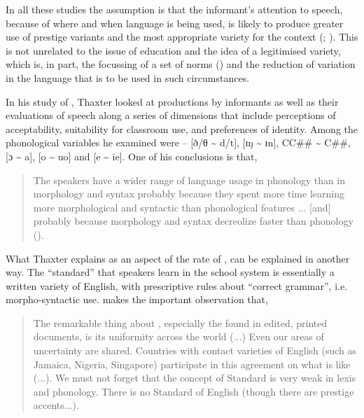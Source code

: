 In all these studies the assumption is that the informant’s attention to speech, because of where and when language is being used, is likely to produce greater use of prestige variants and the most appropriate variety for the context (\citealt{Labov1966,Labov1972}; \citealt{Wolfson1976}).  This is not unrelated to the issue of education and the idea of a legitimised variety, which is, in part, the focussing of a set of norms (\citealt{LePage1975}) and the reduction of variation in the language that is to be used in such circumstances.   

In his study of , Thaxter looked at productions by informants as well as their evaluations of speech along a series of dimensions that include perceptions of acceptability, suitability for classroom use, and preferences of identity.  Among the phonological variables he examined were –  [ð/θ {\textasciitilde} d/t], [ɪŋ {\textasciitilde} ɪn], CC\#\# {\textasciitilde} C\#\#, [ɔ {\textasciitilde} a], [o {\textasciitilde} uo] and [e {\textasciitilde} ie].  One of his conclusions is that,

\begin{quote}The speakers have a wider range of language usage in phonology than in morphology and syntax probably because they spent more time learning more morphological and syntactic than phonological features ... [and] probably because morphology and syntax decreolize faster than phonology (\citeyear[215]{Thaxter1977}).\end{quote}

What Thaxter explains as an aspect of the rate of , can be explained in another way.  The “standard” that speakers learn in the school system is essentially a written variety of English, with prescriptive rules about “correct grammar”, i.e. morpho-syntactic use.  \citet[370]{Gupta2001} makes the important observation that, 

\begin{quote}The remarkable thing about , especially the  found in edited, printed documents, is its uniformity across the world (...) Even our areas of uncertainty are shared.  Countries with contact varieties of English (such as Jamaica, Nigeria, Singapore) participate in this agreement on what  is like (...). We must not forget that the concept of Standard is very weak in lexis and phonology.  There is no Standard  of English (though there are prestige accents...).\end{quote}

